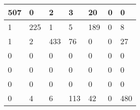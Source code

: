 \begin{tabular}{lllllll}
\hline
  507 & 0 & 2 & 3 & 20 & 0 & 0 \\
\hline
  1 & 225 & 1 & 5 & 189 & 0 & 8 \\
\hline
  1 & 2 & 433 & 76 & 0 & 0 & 27 \\
\hline
  0 & 0 & 0 & 0 & 0 & 0 & 0 \\
\hline
  0 & 0 & 0 & 0 & 0 & 0 & 0 \\
\hline
  0 & 0 & 0 & 0 & 0 & 0 & 0 \\
\hline
  0 & 4 & 6 & 113 & 42 & 0 & 480 \\
\hline
\end{tabular}
